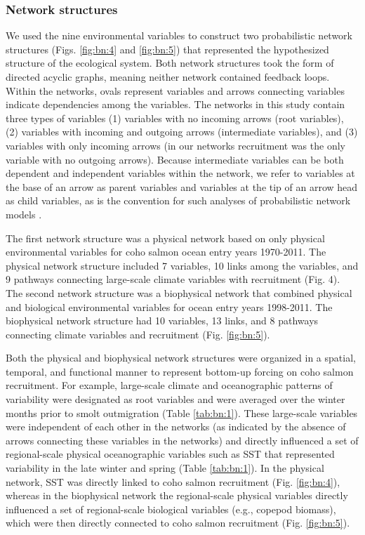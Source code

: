 \subsubsection{Network structures}

We used the nine environmental variables to construct two probabilistic network
structures (Figs. \ref{fig:bn:4} and \ref{fig:bn:5}) that represented the hypothesized structure of the
ecological system. Both network structures took the form of directed acyclic
graphs, meaning neither network contained feedback loops. Within the networks,
ovals represent variables and arrows connecting variables indicate dependencies
among the variables.  The networks in this study contain three types of
variables (1) variables with no incoming arrows (root variables), (2) variables
with incoming and outgoing arrows (intermediate variables), and (3) variables
with only incoming arrows (in our networks recruitment was the only variable
with no outgoing arrows). Because intermediate variables can be both dependent
and independent variables within the network, we refer to variables at the base
of an arrow as parent variables and variables at the tip of an arrow head as
child variables, as is the convention for such analyses of probabilistic network
models \citep{Koller2009a, Korb2004a}.

The first network structure was a physical network based on only physical
environmental variables for coho salmon ocean entry years 1970-2011. The
physical network structure included 7 variables, 10 links among the variables,
and 9 pathways connecting large-scale climate variables with recruitment (Fig.
4). The second network structure was a biophysical network that combined
physical and biological environmental variables for ocean entry years 1998-2011.
The biophysical network structure had 10 variables, 13 links, and 8 pathways
connecting climate variables and recruitment (Fig. \ref{fig:bn:5}).

Both the physical and biophysical network structures were organized in a
spatial, temporal, and functional manner to represent bottom-up forcing on coho
salmon recruitment. For example, large-scale climate and oceanographic patterns
of variability were designated as root variables and were averaged over the
winter months prior to smolt outmigration (Table \ref{tab:bn:1}). These large-scale variables
were independent of each other in the networks (as indicated by the absence of
arrows connecting these variables in the networks) and directly influenced a set
of regional-scale physical oceanographic variables such as SST that represented
variability in the late winter and spring (Table \ref{tab:bn:1}). In the physical network,
SST was directly linked to coho salmon recruitment (Fig. \ref{fig:bn:4}), whereas in the
biophysical network the regional-scale physical variables directly influenced a
set of regional-scale biological variables (e.g., copepod biomass), which were
then directly connected to coho salmon recruitment (Fig. \ref{fig:bn:5}).



